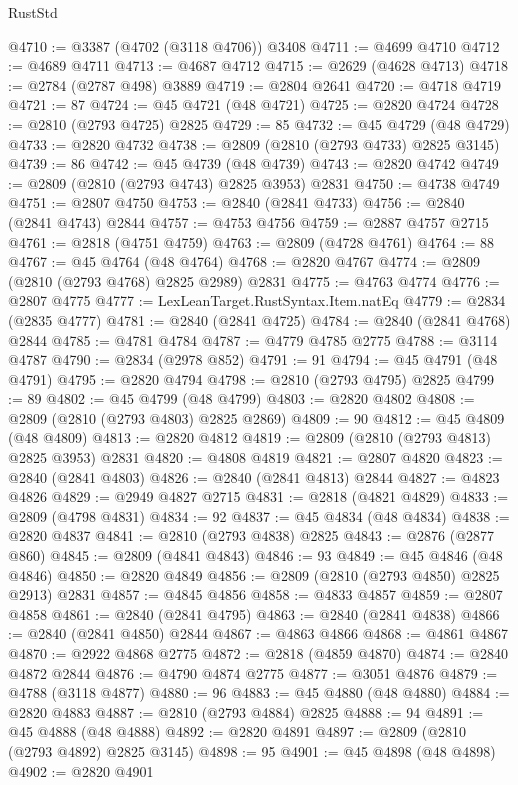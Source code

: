\begin{lexlean}{RustStd}
\begin{coremodule}
@4710 := @3387 (@4702 (@3118 @4706)) @3408
@4711 := @4699 @4710
@4712 := @4689 @4711
@4713 := @4687 @4712
@4715 := @2629 (@4628 @4713)
@4718 := @2784 (@2787 @498) @3889
@4719 := @2804 @2641
@4720 := @4718 @4719
@4721 := 87
@4724 := @45 @4721 (@48 @4721)
@4725 := @2820 @4724
@4728 := @2810 (@2793 @4725) @2825
@4729 := 85
@4732 := @45 @4729 (@48 @4729)
@4733 := @2820 @4732
@4738 := @2809 (@2810 (@2793 @4733) @2825 @3145)
@4739 := 86
@4742 := @45 @4739 (@48 @4739)
@4743 := @2820 @4742
@4749 := @2809 (@2810 (@2793 @4743) @2825 @3953) @2831
@4750 := @4738 @4749
@4751 := @2807 @4750
@4753 := @2840 (@2841 @4733)
@4756 := @2840 (@2841 @4743) @2844
@4757 := @4753 @4756
@4759 := @2887 @4757 @2715
@4761 := @2818 (@4751 @4759)
@4763 := @2809 (@4728 @4761)
@4764 := 88
@4767 := @45 @4764 (@48 @4764)
@4768 := @2820 @4767
@4774 := @2809 (@2810 (@2793 @4768) @2825 @2989) @2831
@4775 := @4763 @4774
@4776 := @2807 @4775
@4777 := LexLeanTarget.RustSyntax.Item.natEq
@4779 := @2834 (@2835 @4777)
@4781 := @2840 (@2841 @4725)
@4784 := @2840 (@2841 @4768) @2844
@4785 := @4781 @4784
@4787 := @4779 @4785 @2775
@4788 := @3114 @4787
@4790 := @2834 (@2978 @852)
@4791 := 91
@4794 := @45 @4791 (@48 @4791)
@4795 := @2820 @4794
@4798 := @2810 (@2793 @4795) @2825
@4799 := 89
@4802 := @45 @4799 (@48 @4799)
@4803 := @2820 @4802
@4808 := @2809 (@2810 (@2793 @4803) @2825 @2869)
@4809 := 90
@4812 := @45 @4809 (@48 @4809)
@4813 := @2820 @4812
@4819 := @2809 (@2810 (@2793 @4813) @2825 @3953) @2831
@4820 := @4808 @4819
@4821 := @2807 @4820
@4823 := @2840 (@2841 @4803)
@4826 := @2840 (@2841 @4813) @2844
@4827 := @4823 @4826
@4829 := @2949 @4827 @2715
@4831 := @2818 (@4821 @4829)
@4833 := @2809 (@4798 @4831)
@4834 := 92
@4837 := @45 @4834 (@48 @4834)
@4838 := @2820 @4837
@4841 := @2810 (@2793 @4838) @2825
@4843 := @2876 (@2877 @860)
@4845 := @2809 (@4841 @4843)
@4846 := 93
@4849 := @45 @4846 (@48 @4846)
@4850 := @2820 @4849
@4856 := @2809 (@2810 (@2793 @4850) @2825 @2913) @2831
@4857 := @4845 @4856
@4858 := @4833 @4857
@4859 := @2807 @4858
@4861 := @2840 (@2841 @4795)
@4863 := @2840 (@2841 @4838)
@4866 := @2840 (@2841 @4850) @2844
@4867 := @4863 @4866
@4868 := @4861 @4867
@4870 := @2922 @4868 @2775
@4872 := @2818 (@4859 @4870)
@4874 := @2840 @4872 @2844
@4876 := @4790 @4874 @2775
@4877 := @3051 @4876
@4879 := @4788 (@3118 @4877)
@4880 := 96
@4883 := @45 @4880 (@48 @4880)
@4884 := @2820 @4883
@4887 := @2810 (@2793 @4884) @2825
@4888 := 94
@4891 := @45 @4888 (@48 @4888)
@4892 := @2820 @4891
@4897 := @2809 (@2810 (@2793 @4892) @2825 @3145)
@4898 := 95
@4901 := @45 @4898 (@48 @4898)
@4902 := @2820 @4901

\end{coremodule}
\end{lexlean}
